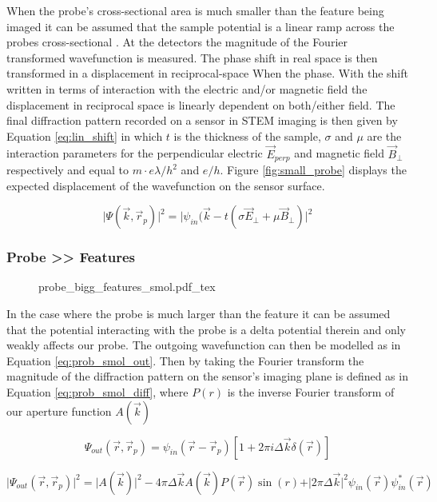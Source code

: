 When the probe's cross-sectional area is much smaller than the feature being imaged it can be assumed that the sample potential is a linear ramp across the probes cross-sectional \cite{caoTheoryPracticeElectron2018}. At the detectors the magnitude of the Fourier transformed wavefunction is measured. The phase shift in real space is then transformed in a displacement in reciprocal-space When the phase. With the shift written in terms of interaction with the electric and/or magnetic field the displacement in reciprocal space is linearly dependent on both/either field. The final diffraction pattern recorded on a sensor in STEM imaging is then given by Equation \ref{eq:lin_shift} in which $t$ is the thickness of the sample, $\sigma$ and $\mu$ are the interaction parameters for the perpendicular electric $\vec{E}_{perp}$ and magnetic field $\vec{B}_{\perp}$ respectively and equal to $m\cdot e \lambda / h^ 2$ and $e / h$. Figure \ref{fig:small_probe} displays the expected displacement of the wavefunction on the sensor surface.

\begin{equation}
    \vert \Psi(\vec{k},\vec{r}_p)\vert^2 = \vert \psi_{in}(\vec{k}-t(\sigma \vec{E}_{\perp}+\mu \vec{B}_{\perp})\vert^2
    \label{eq:lin_shift}
\end{equation}


\subsubsection{Probe >> Features}
\begin{figure}[h]
	\centering
	\def\svgwidth{1\linewidth}
    {probe_bigg_features_smol.pdf_tex}
	\caption{}
	\label{fig:big_boii_probe}
\end{figure}
In the case where the probe is much larger than the feature it can be assumed that the potential interacting with the probe is a delta potential therein and only weakly affects our probe. The outgoing wavefunction can then be modelled as in Equation \ref{eq:prob_smol_out}. Then by taking the Fourier transform the magnitude of the diffraction pattern on the sensor's imaging plane is defined as in Equation \ref{eq:prob_smol_diff}, where $P(r)$ is the inverse Fourier transform of our aperture function $A(\vec{k})$

\begin{equation}
    \Psi_{out}(\vec{r},\vec{r}_p)=\psi_{in}(\vec{r}-\vec{r}_p)\left[ 1+2\pi i \Delta \vec{k}\delta(\vec{r})\right]
    \label{eq:prob_smol_out}
\end{equation}


\begin{equation}
    \vert \Psi_{out}(\vec{r},\vec{r}_p)\vert^2 = \vert A(\vec{k})\vert^2-4\pi \Delta \vec{k} A(\vec{k})P(\vec{r})\sin(r) + \vert 2\pi\Delta \vec{k}\vert^2 \psi_{in}(\vec{r})\psi^*_{in}(\vec{r})
    \label{eq:prob_smol_diff}
\end{equation}
